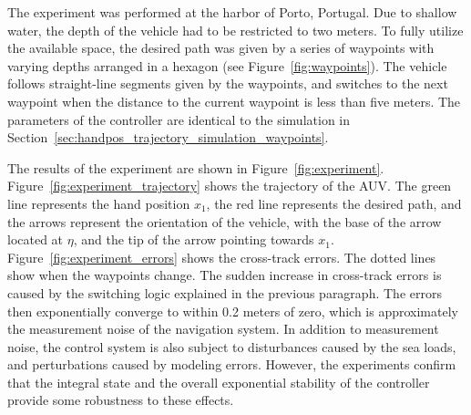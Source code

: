 
The experiment was performed at the harbor of Porto, Portugal.
Due to shallow water, the depth of the vehicle had to be restricted to two meters.
To fully utilize the available space, the desired path was given by a series of waypoints with varying depths arranged in a hexagon (see Figure~\ref{fig:waypoints}).
The vehicle follows straight-line segments given by the waypoints, and switches to the next waypoint when the distance to the current waypoint is less than five meters.
The parameters of the controller are identical to the simulation in Section~\ref{sec:handpos_trajectory_simulation_waypoints}.

The results of the experiment are shown in Figure~\ref{fig:experiment}.
Figure~\ref{fig:experiment_trajectory} shows the trajectory of the AUV.
The green line represents the hand position $x_1$, the red line represents the desired path, and the arrows represent the orientation of the vehicle, with the base of the arrow located at $\eta$, and the tip of the arrow pointing towards $x_1$.
Figure~\ref{fig:experiment_errors} shows the cross-track errors.
The dotted lines show when the waypoints change.
The sudden increase in cross-track errors is caused by the switching logic explained in the previous paragraph.
The errors then exponentially converge to within 0.2 meters of zero, which is approximately the measurement noise of the navigation system.
In addition to measurement noise, the control system is also subject to disturbances caused by the sea loads, and perturbations caused by modeling errors.
However, the experiments confirm that the integral state and the overall exponential stability of the controller provide some robustness to these effects.

